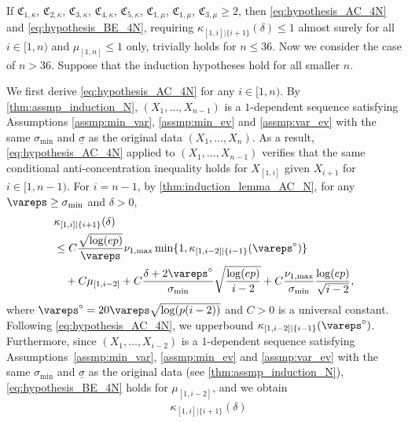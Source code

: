 \documentclass[aos]{imsart}
\begin{document}
\begin{appendix}
If $\mathfrak{C}_{1,\kappa}$, $\mathfrak{C}_{2,\kappa}$, $\mathfrak{C}_{3,\kappa}$, $\mathfrak{C}_{4,\kappa}$, $\mathfrak{C}_{5,\kappa}$, $\mathfrak{C}_{1,\mu}$, $\mathfrak{C}_{1,\mu}$, $\mathfrak{C}_{3,\mu} \geq 2$, then \eqref{eq:hypothesis_AC_4N} and \eqref{eq:hypothesis_BE_4N}, requiring $\kappa_{[1,i]|\{i+1\}}(\delta) \leq 1$ almost surely for all $i \in [1, n)$ and $\mu_{[1,n]} \leq 1$ only, trivially holds for $n \leq 36$. Now we consider the case of $n > 36$. Suppose that the induction hypotheses hold for all smaller $n$.

\medskip
We first derive \eqref{eq:hypothesis_AC_4N} for any $i \in [1,n)$. By \cref{thm:assmp_induction_N}, $(X_1, \dots, X_{n-1})$ is a $1$-dependent sequence satisfying Assumptions \eqref{assmp:min_var}, \eqref{assmp:min_ev} and \eqref{assmp:var_ev} with the same $\sigma_{\min}$ and $\underline{\sigma}$ as the original data $(X_1, \dots, X_n)$. As a result, \eqref{eq:hypothesis_AC_4N} applied to $(X_1, \dots, X_{n-1})$ verifies that the same conditional anti-concentration inequality holds for $X_{[1,i]}$ given $X_{i+1}$ for $ i \in [1,n-1)$. For $i = n-1$, by \cref{thm:induction_lemma_AC_N}, 
for any $\vareps \geq \sigma_{\min}$ and $\delta > 0$,
\begin{equation*} %
\begin{aligned}
    & \kappa_{[1,i]|\{i+1\}}(\delta) \\
    & \leq C
    \frac{\sqrt{\log(ep)}}{\vareps} \nu_{1,\max} 
    \min\{1, \kappa_{[1,i-2]|\{i-1\}}(\vareps^\circ)\} \\
    & \quad + C \mu_{[1,i-2]}
    + C\frac{\delta + 2\vareps^\circ}{\sigma_{\min}} \sqrt{\frac{\log(ep)}{i-2}}
    + C\frac{\nu_{1,\max}}{\sigma_{\min}} \frac{\log(ep)}{\sqrt{i-2}},
\end{aligned}
\end{equation*}
where $\vareps^\circ = 20\vareps \sqrt{\log(p(i-2))}$ and $C > 0$ is a universal constant.
Following \eqref{eq:hypothesis_AC_4N}, we upperbound $\kappa_{[1,i-2]|\{i-1\}}(\vareps^\circ)$. Furthermore, since $(X_1, \dots, X_{i-2})$ is a $1$-dependent sequence satisfying Assumptions~\eqref{assmp:min_var}, \eqref{assmp:min_ev} and \eqref{assmp:var_ev} with the same $\sigma_{\min}$ and $\underline{\sigma}$ as the original data (see \cref{thm:assmp_induction_N}), \eqref{eq:hypothesis_BE_4N} holds for $\mu_{[1,i-2]}$, and we obtain
\begin{equation*} %
\begin{aligned}
    & \kappa_{[1,i]|\{i+1\}}(\delta) \\

\end{aligned}
\end{equation*}
\end{appendix}
\end{document}
